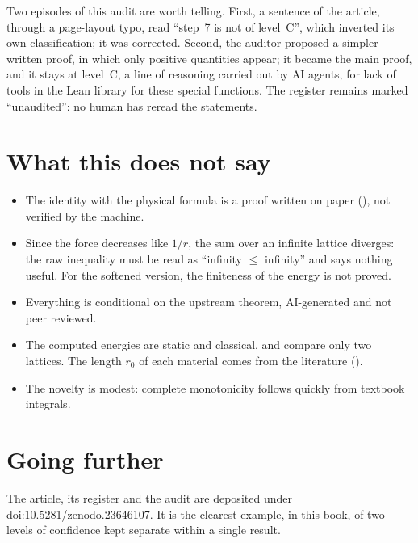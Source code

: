 Two episodes of this audit are worth telling. First, a sentence of the article, through a page-layout typo, read
``step~7 is not of level~C'', which inverted its own classification; it was corrected. Second, the auditor proposed
a simpler written proof, in which only positive quantities appear; it became the main proof, and it stays at
level~C, a line of reasoning carried out by AI agents, for lack of tools in the Lean library for these special functions. The register
remains marked ``unaudited'': no human has reread the statements.

\section*{What this does not say}

\begin{limite}
\begin{itemize}
\item The identity with the physical formula is a proof written on paper (), not verified by the machine.
\item Since the force decreases like $1/r$, the sum over an infinite lattice diverges: the raw inequality must be
  read as ``infinity $\leq$ infinity'' and says nothing useful. For the softened version, the finiteness of the
  energy is not proved.
\item Everything is conditional on the upstream theorem, AI-generated and not peer reviewed.
\item The computed energies are static and classical, and compare only two lattices. The length $r_0$ of each
  material comes from the literature ().
\item The novelty is modest: complete monotonicity follows quickly from textbook integrals.
\end{itemize}
\end{limite}

\section*{Going further}

The article, its register and the audit are deposited under doi:10.5281/\allowbreak zenodo.23646107. It is the
clearest example, in this book, of two levels of confidence kept separate within a single result.
